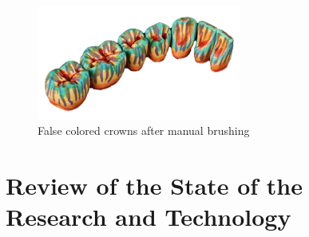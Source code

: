 \begin{figure}[h]
	\centering
	\includegraphics[width=0.6\textwidth]{grafiken/false_colored.png}
	\caption{False colored crowns after manual brushing \citep{zirkonzahn2018}}
	\label{fig:false_colored}
\end{figure}


\chapter{Review of the State of the Research and Technology}
\label{sec:kritik_stand_technik}

